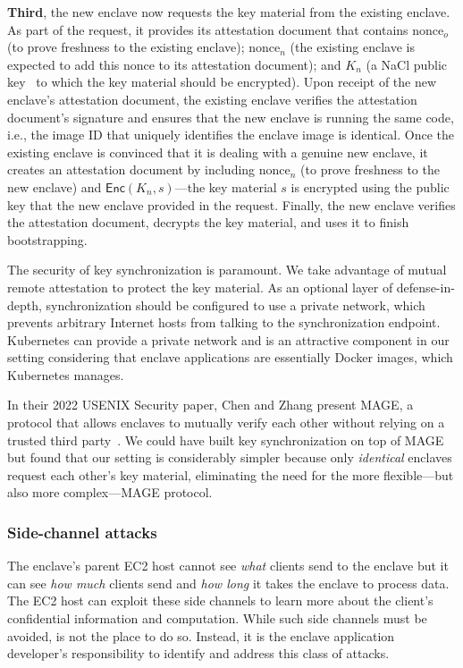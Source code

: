 \textbf{Third}, the new enclave now requests the key material from the existing
enclave.  As part of the request, it provides its attestation document that
contains $\textrm{nonce}_o$ (to prove freshness to the existing enclave);
$\textrm{nonce}_n$ (the existing enclave is expected to add this nonce to its
attestation document); and $K_n$ (a NaCl public key~\cite{nacl} to which the key
material should be encrypted).  Upon receipt of the new enclave's attestation
document, the existing enclave verifies the attestation document's signature and
ensures that the new enclave is running the same code, i.e., the image ID that
uniquely identifies the enclave image is identical.  Once the existing enclave
is convinced that it is dealing with a genuine new enclave, it creates an
attestation document by including $\textrm{nonce}_n$ (to prove freshness to the
new enclave) and $\textsf{Enc}(K_n, s)$---the key material $s$ is encrypted
using the public key that the new enclave provided in the request.  Finally, the
new enclave verifies the attestation document, decrypts the key material, and
uses it to finish bootstrapping.

The security of key synchronization is paramount.  We take advantage of mutual
remote attestation to protect the key material.  As an optional layer of
defense-in-depth, synchronization should be configured to use a private network,
which prevents arbitrary Internet hosts from talking to the synchronization
endpoint.  Kubernetes can provide a private network and is an attractive
component in our setting considering that enclave applications are essentially
Docker images, which Kubernetes manages.

In their 2022 USENIX Security paper, Chen and Zhang present MAGE, a protocol
that allows enclaves to mutually verify each other without relying on a trusted
third party~\cite{Chen2022a}.  We could have built key synchronization on top of
MAGE but found that our setting is considerably simpler because only
\emph{identical} enclaves request each other's key material, eliminating the
need for the more flexible---but also more complex---MAGE protocol.

\subsubsection{Side-channel attacks}%
\label{sec:side-channels}

The enclave's parent EC2 host cannot see \emph{what} clients send to the enclave
but it can see \emph{how much} clients send and \emph{how long} it takes the
enclave to process data.  The EC2 host can exploit these side channels to learn
more about the client's confidential information and computation.  While such
side channels must be avoided, \tool{} is not the place to do so.  Instead, it
is the enclave application developer's responsibility to identify and address
this class of attacks.

